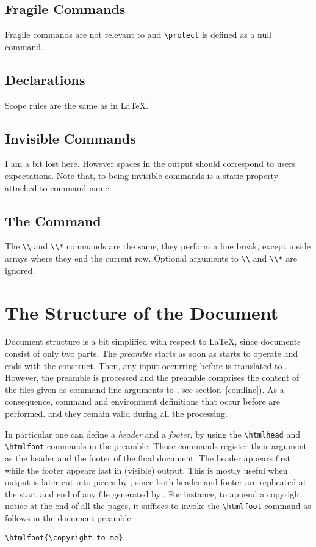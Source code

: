 \subsection{Fragile Commands}
Fragile commands are not relevant to \hevea{} and \verb+\protect+ is
defined as a null command.

\subsection{Declarations}
Scope rules are the same as in \LaTeX.

\subsection{Invisible Commands}
I am a bit lost here. However spaces in the output should correspond
to users expectations. Note that, to \hevea{} being
invisible commands is a static property attached to command name.

\subsection{The \texttt{} Command}

The \verb+\\+ and \verb+\\*+ commands are the same, they perform a
line break, except inside arrays where they end the current row.
Optional arguments to \verb+\\+ and \verb+\\*+ are ignored.


\section{The Structure of the Document}\label{structure}
Document structure is a bit simplified with respect to \LaTeX{}, since
documents consist of only two parts.
The \emph{preamble} starts as soon as \hevea{} starts to operate and
ends with the \verb++ construct.
Then, any input occurring before
\verb++ is translated to \html{}.
However, the preamble is processed
and the preamble comprises the content of the files given as command-line
arguments to \hevea{}, see section~\ref{comline}).
As a consequence, command and environment  definitions that
occur  before \verb++ are performed.
and they remain
valid during all the processing.

In particular one can define a \emph{header} and a \emph{footer}, by using the
\verb+\htmlhead+ and \verb+\htmlfoot+ commands in the preamble.
Those commands register their argument as the header and the footer of
the final \html{} document. The header appears first while the footer
appears last in (visible) \html{} output.
This is mostly useful when \hevea{} output is later cut into pieces by
\hacha{}, since both header and footer are replicated
at the start and end of any file generated by \hacha.
For instance, to append a copyright notice at the end of all the \html{}
pages, it suffices to invoke the \verb+\htmlfoot+ command as follows
in the document preamble:
\begin{verbatim}
\htmlfoot{\copyright to me}
\end{verbatim}


